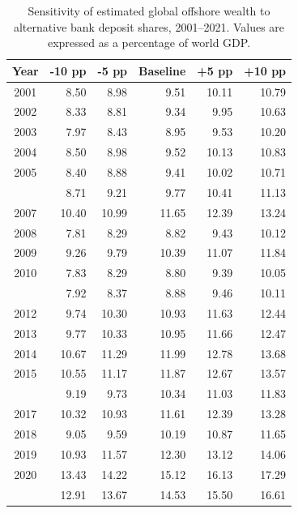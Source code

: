 \begin{table}
\caption{\label{tab:tab:sensitivity_deposits}Sensitivity of estimated global offshore wealth to alternative bank deposit shares, 2001--2021. Values are expressed as a percentage of world GDP.}
\centering
\begin{tabular}[t]{crrrrr}
\toprule
Year & -10 pp & -5 pp & Baseline & +5 pp & +10 pp\\
\midrule
2001 & 8.50 & 8.98 & 9.51 & 10.11 & 10.79\\
2002 & 8.33 & 8.81 & 9.34 & 9.95 & 10.63\\
2003 & 7.97 & 8.43 & 8.95 & 9.53 & 10.20\\
2004 & 8.50 & 8.98 & 9.52 & 10.13 & 10.83\\
2005 & 8.40 & 8.88 & 9.41 & 10.02 & 10.71\\
\addlinespace
2006 & 8.71 & 9.21 & 9.77 & 10.41 & 11.13\\
2007 & 10.40 & 10.99 & 11.65 & 12.39 & 13.24\\
2008 & 7.81 & 8.29 & 8.82 & 9.43 & 10.12\\
2009 & 9.26 & 9.79 & 10.39 & 11.07 & 11.84\\
2010 & 7.83 & 8.29 & 8.80 & 9.39 & 10.05\\
\addlinespace
2011 & 7.92 & 8.37 & 8.88 & 9.46 & 10.11\\
2012 & 9.74 & 10.30 & 10.93 & 11.63 & 12.44\\
2013 & 9.77 & 10.33 & 10.95 & 11.66 & 12.47\\
2014 & 10.67 & 11.29 & 11.99 & 12.78 & 13.68\\
2015 & 10.55 & 11.17 & 11.87 & 12.67 & 13.57\\
\addlinespace
2016 & 9.19 & 9.73 & 10.34 & 11.03 & 11.83\\
2017 & 10.32 & 10.93 & 11.61 & 12.39 & 13.28\\
2018 & 9.05 & 9.59 & 10.19 & 10.87 & 11.65\\
2019 & 10.93 & 11.57 & 12.30 & 13.12 & 14.06\\
2020 & 13.43 & 14.22 & 15.12 & 16.13 & 17.29\\
\addlinespace
2021 & 12.91 & 13.67 & 14.53 & 15.50 & 16.61\\
\bottomrule
\end{tabular}
\end{table}

